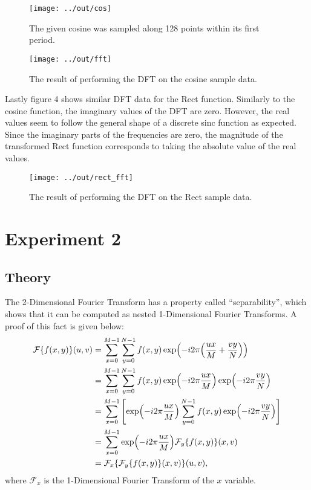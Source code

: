 \documentclass[headings=optiontoheadandtoc,listof=totoc,parskip=full]{scrartcl}
\begin{document}
\begin{figure}[ht]
	\centering
	\texttt{[image: ../out/cos]}
	\caption{The given cosine was sampled along 128 points within its first period.}
	\label{fig:cos}
\end{figure}

\begin{figure}[ht]
	\centering
	\texttt{[image: ../out/fft]}
	\caption{The result of performing the DFT on the cosine sample data.}
	\label{fig:fft}
\end{figure}

Lastly figure 4 shows similar DFT data for the Rect function. Similarly to the cosine function, the imaginary values of the DFT are zero. However, the real values seem to follow the general shape of a discrete sinc function as expected. Since the imaginary parts of the frequencies are zero, the magnitude of the transformed Rect function corresponds to taking the absolute value of the real values.

\begin{figure}[ht]
	\centering
	\texttt{[image: ../out/rect\_fft]}
	\caption{The result of performing the DFT on the Rect sample data.}
	\label{fig:fft}
\end{figure}


\section{Experiment 2}
\label{sec:exp-2}

\subsection{Theory}
The 2-Dimensional Fourier Transform has a property called ``separability'', which shows that it can be computed as nested 1-Dimensional Fourier Transforms. A proof of this fact is given below:
\begin{equation}
\label{eq:separability}
\begin{aligned}
	\mathcal{F}\{f(x,y)\}(u,v) &= \sum_{x = 0}^{M - 1} \sum_{y = 0}^{N - 1} f(x,y) \exp(-i2\pi\qty(\frac{ux}{M} + \frac{vy}{N}))\\
		&= \sum_{x = 0}^{M - 1} \sum_{y = 0}^{N - 1} f(x,y) \exp(-i2\pi\frac{ux}{M})\exp(-i2\pi\frac{vy}{N})\\
		&= \sum_{x = 0}^{M - 1} \qty[\exp(-i2\pi\frac{ux}{M}) \sum_{y = 0}^{N - 1} f(x,y) \exp(-i2\pi\frac{vy}{N})]\\
		&= \sum_{x = 0}^{M - 1} \exp(-i2\pi\frac{ux}{M}) \mathcal{F}_y\{f(x,y)\}(x,v)\\
		&= \mathcal{F}_x\{\mathcal{F}_y\{f(x,y)\}(x,v)\}(u,v),
\end{aligned}
\end{equation}
where $\mathcal{F}_x$ is the 1-Dimensional Fourier Transform of the $x$ variable.
\end{document}
